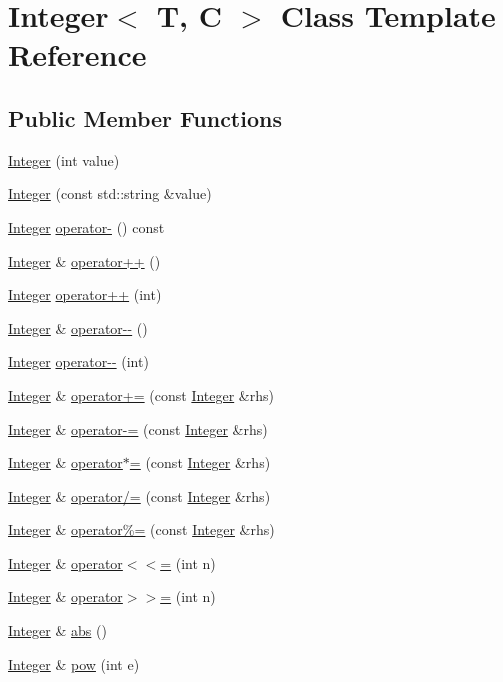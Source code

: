 \hypertarget{classInteger}{\section{Integer$<$ T, C $>$ Class Template Reference}
\label{classInteger}
}
\subsection*{Public Member Functions}
\begin{DoxyCompactItemize}
\item 
\hyperlink{classInteger_a1d5315e4ec5b56b8cb3a6991d514f7d6}{Integer} (int value)
\item 
\hyperlink{classInteger_afebf72d47413ceedcc30b74c3055b771}{Integer} (const std\-::string \&value)
\item 
\hyperlink{classInteger}{Integer} \hyperlink{classInteger_ae9d1fb575b55ac2f6352a2d735c4bb75}{operator-\/} () const 
\item 
\hyperlink{classInteger}{Integer} \& \hyperlink{classInteger_a3fc47ae07dce44aa72ce9e02b9a3e003}{operator++} ()
\item 
\hyperlink{classInteger}{Integer} \hyperlink{classInteger_a326d5bd7d72ad858f523bed95ae66150}{operator++} (int)
\item 
\hyperlink{classInteger}{Integer} \& \hyperlink{classInteger_ac6227ea2b4a75ff08d537db0d3a26be4}{operator-\/-\/} ()
\item 
\hyperlink{classInteger}{Integer} \hyperlink{classInteger_ae5b697679221dbf1fbc942335bb19fb4}{operator-\/-\/} (int)
\item 
\hyperlink{classInteger}{Integer} \& \hyperlink{classInteger_a0c37e366a26b17cfd73b1b29a1e8b47b}{operator+=} (const \hyperlink{classInteger}{Integer} \&rhs)
\item 
\hyperlink{classInteger}{Integer} \& \hyperlink{classInteger_a2bff1e6dc8f6990028783da8bdd89b0d}{operator-\/=} (const \hyperlink{classInteger}{Integer} \&rhs)
\item 
\hyperlink{classInteger}{Integer} \& \hyperlink{classInteger_acf1388dc4ce49c9b7d69b3b6c3a245f7}{operator$\ast$=} (const \hyperlink{classInteger}{Integer} \&rhs)
\item 
\hyperlink{classInteger}{Integer} \& \hyperlink{classInteger_aa13c715bbc68c58c2bd1f1b49a80277e}{operator/=} (const \hyperlink{classInteger}{Integer} \&rhs)
\item 
\hyperlink{classInteger}{Integer} \& \hyperlink{classInteger_a5af44fd8bef5e32fa720b1262045f1b7}{operator\%=} (const \hyperlink{classInteger}{Integer} \&rhs)
\item 
\hyperlink{classInteger}{Integer} \& \hyperlink{classInteger_a4114e69e0da713f50f9cf946cfc70637}{operator$<$$<$=} (int n)
\item 
\hyperlink{classInteger}{Integer} \& \hyperlink{classInteger_a0fbada94834715ce6b91c39e5d41d24f}{operator$>$$>$=} (int n)
\item 
\hyperlink{classInteger}{Integer} \& \hyperlink{classInteger_a28b38b99580e4787e353c6630c3cf063}{abs} ()
\item 
\hyperlink{classInteger}{Integer} \& \hyperlink{classInteger_aae56deca12053a28469749c93c9f7343}{pow} (int e)
\end{DoxyCompactItemize}
